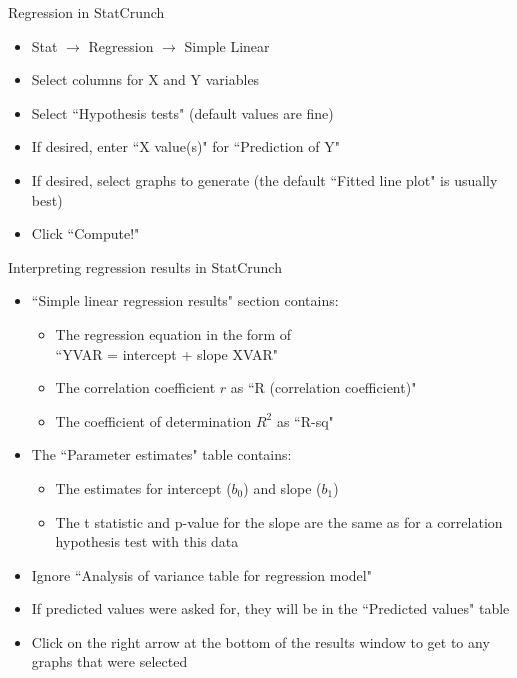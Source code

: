 \documentclass[xcolor=table]{beamer}
\begin{document}
\begin{frame}{Regression in StatCrunch}
\begin{block}{}
\large
\begin{itemize}
\item Stat $\to$ Regression $\to$ Simple Linear
\item Select columns for X and Y variables
\item Select ``Hypothesis tests" (default values are fine)
\item If desired, enter ``X value(s)" for ``Prediction of Y"
\item If desired, select graphs to generate (the default ``Fitted line plot" is usually best)
\item Click ``Compute!"
\end{itemize}
\end{block}
\end{frame}

\begin{frame}{Interpreting regression results in StatCrunch}
\begin{block}{}
\large
\begin{itemize}
\item ``Simple linear regression results" section contains:
\begin{itemize}
\item The regression equation in the form of\\ ``YVAR = intercept + slope XVAR"
\item The correlation coefficient $r$ as ``R (correlation coefficient)"
\item The coefficient of determination $R^2$ as ``R-sq"
\end{itemize}
\item The ``Parameter estimates" table contains:
\begin{itemize}
\item The estimates for intercept ($b_0$) and slope ($b_1$)
\item The t statistic and p-value for the slope are the same as for a correlation hypothesis test with this data
\end{itemize}
\item Ignore ``Analysis of variance table for regression model"
\item If predicted values were asked for, they will be in the ``Predicted values" table
\item Click on the right arrow at the bottom of the results window to get to any graphs that were selected
\end{itemize}
\end{block}
\end{frame}
\end{document}

